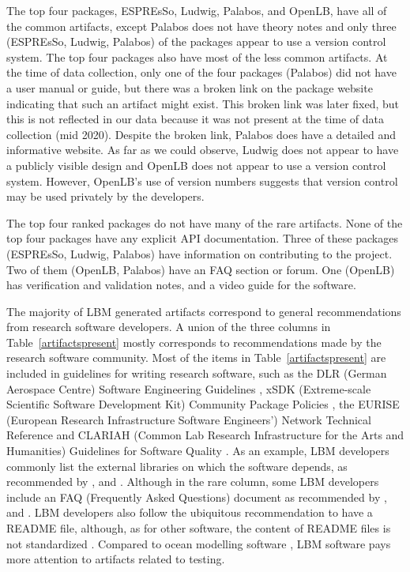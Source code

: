 \documentclass[final, 3p, times, authoryear]{elsarticle}
\begin{document}
The top four packages, ESPREsSo, Ludwig, Palabos, and OpenLB, have all of the
common artifacts, except Palabos does not have theory notes and only three
(ESPREsSo, Ludwig, Palabos) of the packages appear to use a version control
system.  The top four packages also have most of the less common artifacts. At
the time of data collection, only one of the four packages (Palabos) did not
have a user manual or guide, but there was a broken link on the package website
indicating that such an artifact might exist. This broken link was later fixed,
but this is not reflected in our data because it was not present at the time of
data collection (mid 2020). Despite the broken link, Palabos does have a
detailed and informative website. As far as we could observe, Ludwig does not
appear to have a publicly visible design and OpenLB does not appear to use a
version control system. However, OpenLB's use of version numbers suggests that
version control may be used privately by the developers.

The top four ranked packages do not have many of the rare artifacts. None of the
top four packages have any explicit API documentation. Three of these packages
(ESPREsSo, Ludwig, Palabos) have information on contributing to the project. Two
of them (OpenLB, Palabos) have an FAQ section or forum. One (OpenLB) has
verification and validation notes, and a video guide for the software. 

The majority of LBM generated artifacts correspond to general recommendations
from research software developers.  A union of the three columns in
Table~\ref{artifactspresent} mostly corresponds to recommendations made by the
research software community.  Most of the items in Table~\ref{artifactspresent}
are included in guidelines for writing research software, such as the DLR
(German Aerospace Centre) Software Engineering Guidelines
\citep{TobiasEtAl2018}, xSDK (Extreme-scale Scientific Software Development Kit)
Community Package Policies \citep{SmithAndRoscoe2018}, the EURISE (European
Research Infrastructure Software Engineers') Network Technical Reference
\cite{ThielEtAl2020} and CLARIAH (Common Lab Research Infrastructure for the
Arts and Humanities) Guidelines for Software Quality \citep{vanGompelEtAl2016}.
As an example, LBM developers commonly list the external libraries on which the
software depends, as recommended by \citet{BrettEtAl2021},
\citet{SmithAndRoscoe2018} and \citet{vanGompelEtAl2016}. Although in the rare
column, some LBM developers include an FAQ (Frequently Asked Questions) document
as recommended by \citep{OrvizEtAl2017}, \citep{ThielEtAl2020} and
\citep{vanGompelEtAl2016}. LBM developers also follow the ubiquitous
recommendation to have a README file, although, as for other software, the
content of README files is not standardized \citep{PranaEtAl2018}.  Compared to
ocean modelling software \citep{JungEtAl2022}, LBM software pays more
attention to artifacts related to testing.
\end{document}
